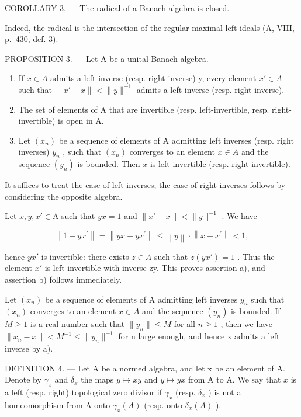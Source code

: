 COROLLARY 3. --- The radical of a Banach algebra is closed.

Indeed, the radical is the intersection of the regular maximal left ideals (A, VIII, p.~430, def. 3).

PROPOSITION 3. --- Let A be a unital Banach algebra.

\begin{enumerate}
\def\labelenumi{\alph{enumi})}
\item
  If \(x \in A\) admits a left inverse (resp. right inverse) y, every element \(x' \in A\) such that \(\|x' - x\| < \|y\|^{-1}\) admits a left inverse (resp. right inverse).
\item
  The set of elements of A that are invertible (resp. left-invertible, resp. right-invertible) is open in A.
\item
  Let \((x_{n})\) be a sequence of elements of A admitting left inverses (resp. right inverses) \(y_{n}\) , such that \((x_{n})\) converges to an element \(x \in A\) and the sequence \((y_{n})\) is bounded. Then \(x\) is left-invertible (resp. right-invertible).
\end{enumerate}

It suffices to treat the case of left inverses; the case of right inverses follows by considering the opposite algebra.

Let \(x, y, x' \in \mathrm{A}\) such that \(yx = 1\) and \(\|x' - x\| < \|y\|^{-1}\) . We have

\[
\left\| 1 - y x ^ {\prime} \right\| = \left\| y x - y x ^ {\prime} \right\| \leqslant \left\| y \right\| \cdot \left\| x - x ^ {\prime} \right\| <   1,
\]

hence \(yx'\) is invertible: there exists \(z \in A\) such that \(z(yx') = 1\) . Thus the element \(x'\) is left-invertible with inverse zy. This proves assertion a), and assertion b) follows immediately.

  Let \((x_{n})\) be a sequence of elements of A admitting left inverses \(y_{n}\) such that \((x_{n})\) converges to an element \(x \in A\) and the sequence \((y_{n})\) is bounded. If \(M \geqslant 1\) is a real number such that \(\|y_{n}\| \leqslant M\) for all \(n \geqslant 1\) , then we have \(\|x_{n} - x\| < M^{-1} \leqslant \|y_{n}\|^{-1}\) for n large enough, and hence x admits a left inverse by a).

DEFINITION 4. --- Let A be a normed algebra, and let x be an element of A. Denote by \(\gamma_x\) and \(\delta_x\) the maps \(y \mapsto xy\) and \(y \mapsto yx\) from A to A. We say that \(x\) is a left (resp. right) topological zero divisor if \(\gamma_x\) (resp. \(\delta_x\) ) is not a homeomorphism from A onto \(\gamma_x(A)\) (resp. onto \(\delta_x(A)\) ).

